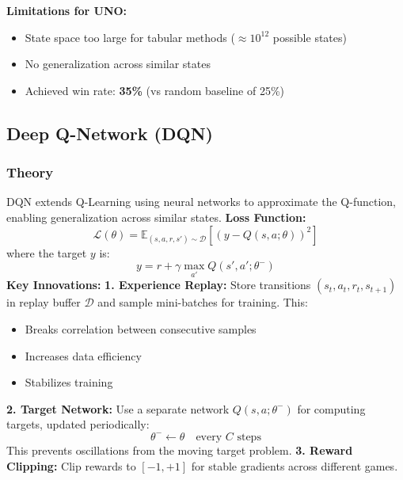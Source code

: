 \documentclass[12pt,a4paper]{article}
\begin{document}
\textbf{Limitations for UNO:}
\begin{itemize}
    \item State space too large for tabular methods ($\approx 10^{12}$ possible states)
    \item No generalization across similar states
    \item Achieved win rate: \textbf{35\%} (vs random baseline of 25\%)
\end{itemize}
\newpage
\subsection{Deep Q-Network (DQN)}
\label{subsec:dqn}
\subsubsection{Theory}
DQN extends Q-Learning using neural networks to approximate the Q-function, enabling generalization across similar states.
\textbf{Loss Function:}
\begin{equation}
    \mathcal{L}(\theta) = \mathbb{E}_{(s,a,r,s') \sim \mathcal{D}} \left[ \left( y - Q(s, a; \theta) \right)^2 \right]
\end{equation}
where the target $y$ is:
\begin{equation}
    y = r + \gamma \max_{a'} Q(s', a'; \theta^-)
\end{equation}
\textbf{Key Innovations:}
\textbf{1. Experience Replay:}
Store transitions $(s_t, a_t, r_t, s_{t+1})$ in replay buffer $\mathcal{D}$ and sample mini-batches for training. This:
\begin{itemize}
    \item Breaks correlation between consecutive samples
    \item Increases data efficiency
    \item Stabilizes training
\end{itemize}
\textbf{2. Target Network:}
Use a separate network $Q(s,a;\theta^-)$ for computing targets, updated periodically:
\begin{equation}
    \theta^- \leftarrow \theta \quad \text{every } C \text{ steps}
\end{equation}
This prevents oscillations from the moving target problem.
\textbf{3. Reward Clipping:}
Clip rewards to $[-1, +1]$ for stable gradients across different games.
\end{document}
